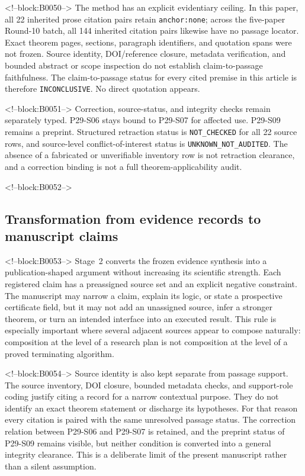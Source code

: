 \documentclass[11pt,a4paper]{article}
\begin{document}
<!--block:B0050-->
The method has an explicit evidentiary ceiling. In this paper, all 22 inherited prose citation pairs retain \texttt{anchor:none}; across the five-paper Round-10 batch, all 144 inherited citation pairs likewise have no passage locator. Exact theorem pages, sections, paragraph identifiers, and quotation spans were not frozen. Source identity, DOI/reference closure, metadata verification, and bounded abstract or scope inspection do not establish claim-to-passage faithfulness. The claim-to-passage status for every cited premise in this article is therefore \texttt{INCONCLUSIVE}. No direct quotation appears.

<!--block:B0051-->
Correction, source-status, and integrity checks remain separately typed. P29-S06 stays bound to P29-S07 for affected use. P29-S09 remains a preprint. Structured retraction status is \texttt{NOT\_CHECKED} for all 22 source rows, and source-level conflict-of-interest status is \texttt{UNKNOWN\_NOT\_AUDITED}. The absence of a fabricated or unverifiable inventory row is not retraction clearance, and a correction binding is not a full theorem-applicability audit.

<!--block:B0052-->
\subsection{Transformation from evidence records to manuscript claims}

<!--block:B0053-->
Stage~2 converts the frozen evidence synthesis into a publication-shaped argument without increasing its scientific strength. Each registered claim has a preassigned source set and an explicit negative constraint. The manuscript may narrow a claim, explain its logic, or state a prospective certificate field, but it may not add an unassigned source, infer a stronger theorem, or turn an intended interface into an executed result. This rule is especially important where several adjacent sources appear to compose naturally: composition at the level of a research plan is not composition at the level of a proved terminating algorithm.

<!--block:B0054-->
Source identity is also kept separate from passage support. The source inventory, DOI closure, bounded metadata checks, and support-role coding justify citing a record for a narrow contextual purpose. They do not identify an exact theorem statement or discharge its hypotheses. For that reason every citation is paired with the same unresolved passage status. The correction relation between P29-S06 and P29-S07 is retained, and the preprint status of P29-S09 remains visible, but neither condition is converted into a general integrity clearance. This is a deliberate limit of the present manuscript rather than a silent assumption.
\end{document}
